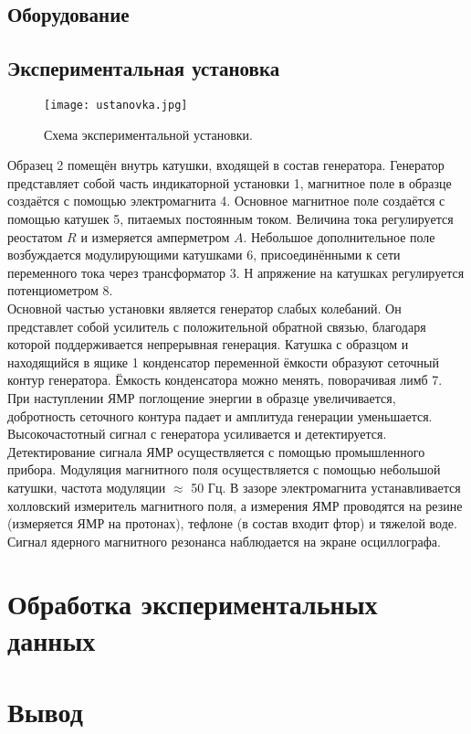 \documentclass[a4paper, 14pt]{article}
\begin{document}
\subsection*{\textcolor{sub_header}{Оборудование}}


\subsection*{\textcolor{sub_header}{Экспериментальная установка}}

\begin{figure}[htbp]
    \centering
    \texttt{[image: ustanovka.jpg]}
    \caption{Схема экспериментальной установки.}
    \label{fig:ustanovka}
\end{figure}


Образец 2 помещён внутрь катушки, входящей в состав генератора. 
Генератор представляет собой часть индикаторной установки 1, магнитное поле в образце создаётся с помощью электромагнита 4.
Основное магнитное поле создаётся с помощью катушек 5, питаемых постоянным током.
Величина тока регулируется реостатом $R$ и измеряется амперметром $A$. 
Небольшое дополнительное поле возбуждается модулирующими катушками 6, присоединёнными к сети переменного тока через трансформатор 3. Н
апряжение на катушках регулируется потенциометром 8.\\

Основной частью установки является генератор слабых колебаний.
Он представлет собой усилитель с положительной обратной связью, благодаря которой поддерживается непрерывная генерация.
Катушка с образцом и находящийся в ящике 1 конденсатор переменной ёмкости образуют сеточный контур генератора. 
Ёмкость конденсатора можно менять, поворачивая лимб 7. 
При наступлении ЯМР поглощение энергии в образце увеличивается, добротность сеточного контура падает и амплитуда генерации уменьшается. 
Высокочастотный сигнал с генератора усиливается и детектируется.\\

Детектирование сигнала ЯМР осуществляется с помощью промышленного прибора. Модуляция магнитного поля осуществляется с помощью небольшой катушки, частота модуляции $\approx$ 50 Гц. В зазоре электромагнита устанавливается холловский измеритель магнитного поля, а измерения ЯМР проводятся на резине (измеряется ЯМР на протонах), тефлоне (в состав входит фтор) и тяжелой воде.\\
Сигнал ядерного магнитного резонанса наблюдается на экране осциллографа.




\section*{\textcolor{header}{Обработка экспериментальных данных}}



\section*{\textcolor{header}{Вывод}}
\end{document}
